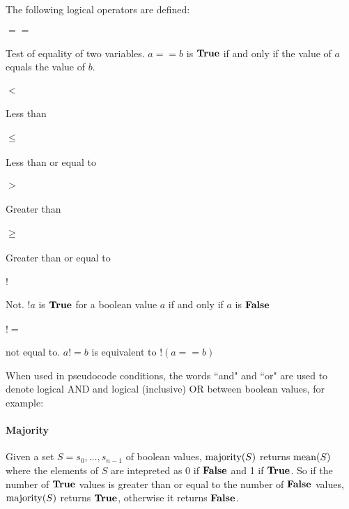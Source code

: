 The following logical operators are defined:

\paragraph*{$==$} Test of equality of two variables. $a==b$ is $\text{\bf{True}}$ if and
only if the value of $a$ equals the value of $b$. 

\paragraph*{$<$}	Less than

\paragraph*{$\leq$} Less than or equal to

\paragraph*{$>$}	Greater than

\paragraph*{$\geq$} Greater than or equal to

\paragraph*{$!$} Not. $!a$ is $\text{\bf{True}}$ for a boolean value $a$ if and only if $a$ is $\text{\bf{False}}$

\paragraph*{$!=$} not equal to. $a!=b$ is equivalent to $!(a==b)$

When used in pseudocode conditions, the words ``and" and ``or" are used to denote logical AND
and logical (inclusive) OR between boolean values, for example:

\begin{pseudo*}
    \bsCODE{\hdots}
\bsEND
\end{pseudo*}

\paragraph*{Majority} Given a set $S=s_0, \hdots, s_{n-1}$ of boolean values, $\operatorname{majority}(S)$ 
returns $\operatorname{mean}(S)$ where the elements of $S$ are intepreted as $0$ if $\text{\bf{False}}$ and 1 if $\text{\bf{True}}$.
So if the number of $\text{\bf{True}}$ values is greater than or equal to the number of $\text{\bf{False}}$ values, $\operatorname{majority}(S)$ returns
$\text{\bf{True}}$, otherwise it returns $\text{\bf{False}}$.
